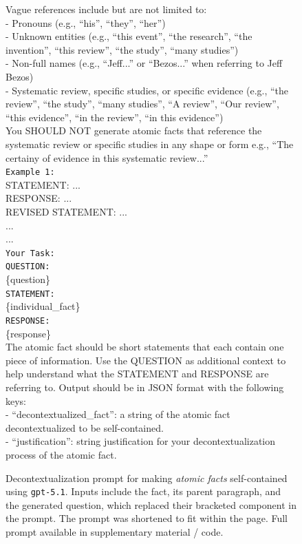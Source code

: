 \documentclass{article}
\begin{document}
\begin{figure}[t]
\begin{small}
\begin{tcolorbox}[
    colback=gray!5,
    colframe=black,
    width=\linewidth,
    arc=2mm,
    boxrule=0.5pt,
    title=\textbf{Atomic Fact Generation (Step 2): Decontextualization Prompt}
]
Vague references include but are not limited to:\\
- Pronouns (e.g., ``his'', ``they'', ``her'')\\
- Unknown entities (e.g., ``this event'', ``the research'', ``the invention'', ``this review'', ``the study'', ``many studies'')\\
- Non-full names (e.g., ``Jeff...'' or ``Bezos...'' when referring to Jeff Bezos)\\
- Systematic review, specific studies, or specific evidence (e.g., ``the review'', ``the study'', ``many studies'', ``A review'', ``Our review'', ``this evidence'', ``in the review'', ``in this evidence'')\\
You SHOULD NOT generate atomic facts that reference the systematic review or specific studies in any shape or form e.g., ``The certainy of evidence in this systematic review...''\\

\texttt{Example 1:}\\
STATEMENT: ...\\
RESPONSE: ...\\
REVISED STATEMENT: ...\\

...\\
...\\

\texttt{Your Task:}\\
\texttt{QUESTION:}\\
\{question\}\\
\texttt{STATEMENT:}\\
\{individual\_fact\}\\
\texttt{RESPONSE:}\\
\{response\}\\

The atomic fact should be short statements that each contain one piece of information. Use the QUESTION as additional context to help understand what the STATEMENT and RESPONSE are referring to. Output should be in JSON format with the following keys:\\
- ``decontextualized\_fact'': a string of the atomic fact decontextualized to be self-contained.\\
- ``justification'': string justification for your decontextualization process of the atomic fact.\\
\end{tcolorbox}

\caption{Decontextualization prompt for making \textit{atomic facts} self-contained using \texttt{gpt-5.1}. Inputs include the fact, its parent paragraph, and the generated question, which replaced their bracketed component in the prompt. The prompt was shortened to fit within the page. Full prompt available in supplementary material / code.}
\label{fig:decontextualization-prompt}
\end{small}
\end{figure}
\end{document}

